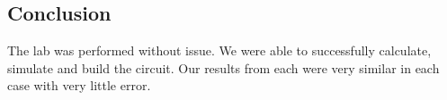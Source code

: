 \documentclass[11pt]{article}
\begin{document}
	\subsection*{Conclusion}
	The lab was performed without issue. We were able to successfully calculate, simulate and build the circuit. Our results from each were very similar in each case with very little error.  
\end{document}
